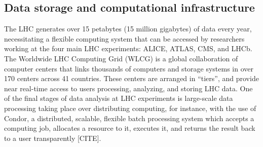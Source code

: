 \subsection{Data storage and computational infrastructure}

The LHC generates over 15 petabytes (15 million gigabytes) of data every year, necessitating a flexible computing system that can be accessed by researchers working at the four main LHC experiments: ALICE, ATLAS, CMS, and LHCb. The Worldwide LHC Computing Grid (WLCG) is a global collaboration of computer centers that links thousands of computers and storage systems in over 170 centers across 41 countries. These centers are arranged in ``tiers'', and provide near real-time access to users processing, analyzing, and storing LHC data. One of the final stages of data analysis at LHC experiments is large-scale data processing taking place over distributing computing, for instance, with the use of Condor, a distributed, scalable, flexible batch processing system which accepts a computing job, allocates a resource to it, executes it, and returns the result back to a user transparently [CITE]. 
 

